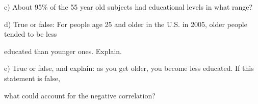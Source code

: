 \documentclass[10pt]{article}
\begin{document}
\hspace{20pt} c) About 95\% of the 55 year old subjects had educational levels in what range?
\vspace{1.4in}

\hspace{20pt} d) True or false:  For people age 25 and older in the U.S. in 2005, older people tended 
to be less\vspace{-5pt}

\hspace{20pt} \hphantom{a) }  educated than younger ones.  Explain.
\vspace{1.4in}


\hspace{20pt} e) True or false, and explain:  as you get older, you become less educated.  
If this statement is false,\vspace{-4pt}

\hspace{20pt} \hphantom{a) }
what could account for the negative correlation?  
\vfill
\eject
\end{document}
